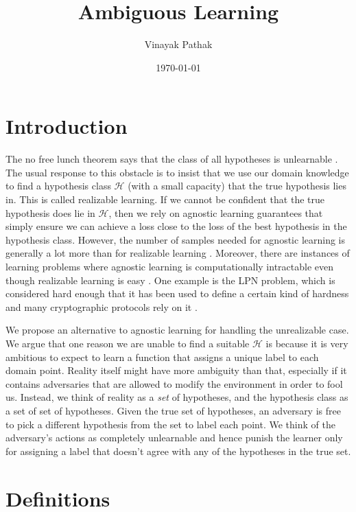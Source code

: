 \documentclass[11pt]{article}
\title{Ambiguous Learning}
\author{Vinayak Pathak}
\date{\today}
\theoremstyle{remark}
\begin{document}
\maketitle

\begin{abstract}
\end{abstract}

\section{Introduction}
The no free lunch theorem says that the class of all hypotheses is unlearnable \cite{blumer1989learnability}. The usual response to this obstacle is to insist that we use our domain knowledge to find a hypothesis class $\mathcal{H}$ (with a small capacity) that the true hypothesis lies in. This is called realizable learning. If we cannot be confident that the true hypothesis does lie in $\mathcal{H}$, then we rely on agnostic learning guarantees that simply ensure we can achieve a loss close to the loss of the best hypothesis in the hypothesis class. However, the number of samples needed for agnostic learning is generally a lot more than for realizable learning \cite{hanneke2016optimal}. Moreover, there are instances of learning problems where agnostic learning is computationally intractable even though realizable learning is easy \cite{blum2003noise}. One example is the LPN problem, which is considered hard enough that it has been used to define a certain kind of hardness and many cryptographic protocols rely on it \cite{blum1994cryptographic,juels2005authenticating,applebaum2009fast}.

We propose an alternative to agnostic learning for handling the unrealizable case. We argue that one reason we are unable to find a suitable $\mathcal{H}$ is because it is very ambitious to expect to learn a function that assigns a unique label to each domain point. Reality itself might have more ambiguity than that, especially if it contains adversaries that are allowed to modify the environment in order to fool us. Instead, we think of reality as a \emph{set} of hypotheses, and the hypothesis class as a set of set of hypotheses. Given the true set of hypotheses, an adversary is free to pick a different hypothesis from the set to label each point. We think of the adversary's actions as completely unlearnable and hence punish the learner only for assigning a label that doesn't agree with any of the hypotheses in the true set. 

\section{Definitions}
\end{document}
